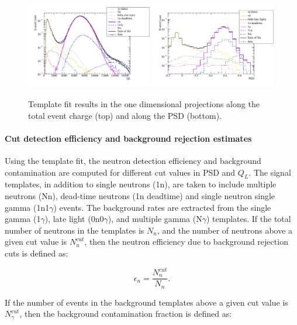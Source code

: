 \documentclass[letter,twocolumn,preprint,3p,numbers,sort&compress]{elsarticle}
\begin{document}
\begin{figure}[!htpb]
\centering 
\includegraphics[width = 0.49\textwidth] {figures/qlfit.pdf} 
\includegraphics[width = 0.49\textwidth] {figures/psdfit.pdf}  
\caption{ Template fit results in the one dimensional projections
  along the total event charge (top) and along the PSD (bottom).}
\label{fig:fits}
\end{figure}


\paragraph{Cut detection efficiency and background rejection estimates}

Using the template fit, the neutron detection efficiency and
background contamination are computed for different cut values in PSD
and $Q_L$.  The signal templates, in addition to single neutrons (1n),
are taken to include multiple neutrons (Nn), dead-time neutrons (1n
deadtime) and single neutron single gamma (1n1$\gamma$) events.  The
background rates are extracted from the single gamma (1$\gamma$), late
light (0n0$\gamma$), and multiple gamma (N$\gamma$) templates.  If the
total number of neutrons in the templates is $N_n$, and the number of
neutrons above a given cut value is $N_n^{cut}$, then the neutron
efficiency due to background rejection cuts is defined as:

\begin{equation}
\epsilon_n = \frac{N_n^{cut}}{N_n}.
\end{equation}

\noindent If the number of events in the background templates above a
given cut value is $N_{\gamma}^{cut}$, then the background
contamination fraction is defined as:
\end{document}
